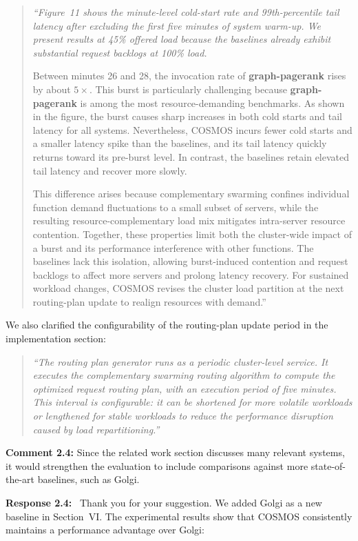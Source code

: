 \documentclass[11pt]{article}
\newcommand{\response}[1]{\par\medskip\noindent\textbf{Response #1:}\ }
\newenvironment{revisionquote}{\begin{quote}\itshape}{\end{quote}}
\begin{document}
\begin{revisionquote}
``Figure~11 shows the minute-level cold-start rate and 99th-percentile tail latency after excluding the first five minutes of system warm-up. We present results at 45\% offered load because the baselines already exhibit substantial request backlogs at 100\% load.

Between minutes 26 and 28, the invocation rate of \textbf{graph-pagerank} rises by about $5\times$. This burst is particularly challenging because \textbf{graph-pagerank} is among the most resource-demanding benchmarks. As shown in the figure, the burst causes sharp increases in both cold starts and tail latency for all systems. Nevertheless, COSMOS incurs fewer cold starts and a smaller latency spike than the baselines, and its tail latency quickly returns toward its pre-burst level. In contrast, the baselines retain elevated tail latency and recover more slowly.

This difference arises because complementary swarming confines individual function demand fluctuations to a small subset of servers, while the resulting resource-complementary load mix mitigates intra-server resource contention. Together, these properties limit both the cluster-wide impact of a burst and its performance interference with other functions. The baselines lack this isolation, allowing burst-induced contention and request backlogs to affect more servers and prolong latency recovery. For sustained workload changes, COSMOS revises the cluster load partition at the next routing-plan update to realign resources with demand.''
\end{revisionquote}

We also clarified the configurability of the routing-plan update period in the implementation section:

\begin{revisionquote}
``The routing plan generator runs as a periodic cluster-level service. It executes the complementary swarming routing algorithm to compute the optimized request routing plan, with an execution period of five minutes. This interval is configurable: it can be shortened for more volatile workloads or lengthened for stable workloads to reduce the performance disruption caused by load repartitioning.''
\end{revisionquote}

\begin{reviewcomment}
\textbf{Comment 2.4:} Since the related work section discusses many relevant systems, it would strengthen the evaluation to include comparisons against more state-of-the-art baselines, such as Golgi.
\end{reviewcomment}
\response{2.4} Thank you for your suggestion. We added Golgi as a new baseline in Section~VI. The experimental results show that COSMOS consistently maintains a performance advantage over Golgi:
\end{document}
